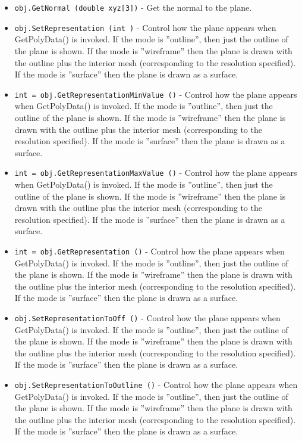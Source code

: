 \begin{itemize}
\item  \verb|obj.GetNormal (double xyz[3])| -  Get the normal to the plane.

\item  \verb|obj.SetRepresentation (int )| -  Control how the plane appears when GetPolyData() is invoked.
 If the mode is ''outline'', then just the outline of the plane
 is shown. If the mode is ''wireframe'' then the plane is drawn
 with the outline plus the interior mesh (corresponding to the
 resolution specified). If the mode is ''surface'' then the plane
 is drawn as a surface.

\item  \verb|int = obj.GetRepresentationMinValue ()| -  Control how the plane appears when GetPolyData() is invoked.
 If the mode is ''outline'', then just the outline of the plane
 is shown. If the mode is ''wireframe'' then the plane is drawn
 with the outline plus the interior mesh (corresponding to the
 resolution specified). If the mode is ''surface'' then the plane
 is drawn as a surface.

\item  \verb|int = obj.GetRepresentationMaxValue ()| -  Control how the plane appears when GetPolyData() is invoked.
 If the mode is ''outline'', then just the outline of the plane
 is shown. If the mode is ''wireframe'' then the plane is drawn
 with the outline plus the interior mesh (corresponding to the
 resolution specified). If the mode is ''surface'' then the plane
 is drawn as a surface.

\item  \verb|int = obj.GetRepresentation ()| -  Control how the plane appears when GetPolyData() is invoked.
 If the mode is ''outline'', then just the outline of the plane
 is shown. If the mode is ''wireframe'' then the plane is drawn
 with the outline plus the interior mesh (corresponding to the
 resolution specified). If the mode is ''surface'' then the plane
 is drawn as a surface.

\item  \verb|obj.SetRepresentationToOff ()| -  Control how the plane appears when GetPolyData() is invoked.
 If the mode is ''outline'', then just the outline of the plane
 is shown. If the mode is ''wireframe'' then the plane is drawn
 with the outline plus the interior mesh (corresponding to the
 resolution specified). If the mode is ''surface'' then the plane
 is drawn as a surface.

\item  \verb|obj.SetRepresentationToOutline ()| -  Control how the plane appears when GetPolyData() is invoked.
 If the mode is ''outline'', then just the outline of the plane
 is shown. If the mode is ''wireframe'' then the plane is drawn
 with the outline plus the interior mesh (corresponding to the
 resolution specified). If the mode is ''surface'' then the plane
 is drawn as a surface.


\end{itemize}
